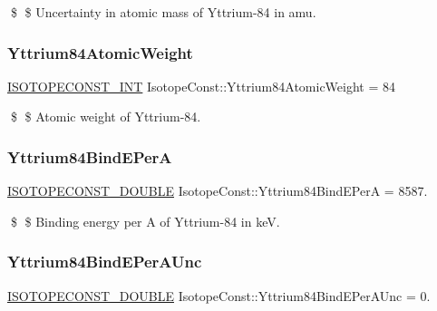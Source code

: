 \$ \$ Uncertainty in atomic mass of Yttrium-\/84 in amu. \mbox{\label{group___isotope_const-_yttrium-_y84_ga01970aa7b241f6d425c6153eda7467eb}} 
\subsubsection{\texorpdfstring{Yttrium84\+Atomic\+Weight}{Yttrium84AtomicWeight}}
{\footnotesize\ttfamily \mbox{\hyperlink{group___isotope_const-_macros_ga5f18360b3e99483a35c32d789e62621c}{I\+S\+O\+T\+O\+P\+E\+C\+O\+N\+S\+T\+\_\+\+I\+NT}} Isotope\+Const\+::\+Yttrium84\+Atomic\+Weight = 84}

\$ \$ Atomic weight of Yttrium-\/84. \mbox{\label{group___isotope_const-_yttrium-_y84_gad014e50546de984831cdf201af352009}} 
\subsubsection{\texorpdfstring{Yttrium84\+Bind\+E\+PerA}{Yttrium84BindEPerA}}
{\footnotesize\ttfamily \mbox{\hyperlink{group___isotope_const-_macros_ga8f45a7272ce02c0b4c65c44636ed719a}{I\+S\+O\+T\+O\+P\+E\+C\+O\+N\+S\+T\+\_\+\+D\+O\+U\+B\+LE}} Isotope\+Const\+::\+Yttrium84\+Bind\+E\+PerA = 8587.}

\$ \$ Binding energy per A of Yttrium-\/84 in keV. \mbox{\label{group___isotope_const-_yttrium-_y84_ga6f0f14e5f6c9ca9c578d29fd0008c353}} 
\subsubsection{\texorpdfstring{Yttrium84\+Bind\+E\+Per\+A\+Unc}{Yttrium84BindEPerAUnc}}
{\footnotesize\ttfamily \mbox{\hyperlink{group___isotope_const-_macros_ga8f45a7272ce02c0b4c65c44636ed719a}{I\+S\+O\+T\+O\+P\+E\+C\+O\+N\+S\+T\+\_\+\+D\+O\+U\+B\+LE}} Isotope\+Const\+::\+Yttrium84\+Bind\+E\+Per\+A\+Unc = 0.}

